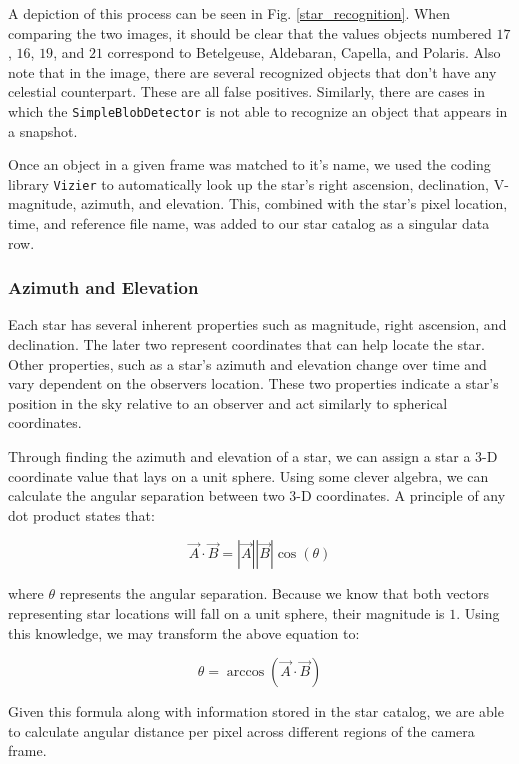 A depiction of this process can be seen in Fig. \ref{star_recognition}.  
When comparing the two images, it should be clear that the values objects numbered $17$, $16$, $19$, and $21$ correspond to Betelgeuse, Aldebaran, Capella, and Polaris. 
Also note that in the image, there are several recognized objects that don't have any celestial counterpart.
These are all false positives.
Similarly, there are cases in which the \texttt{SimpleBlobDetector} is not able to recognize an object that appears in a snapshot.


Once an object in a given frame was matched to it's name, we used the coding library \texttt{Vizier} to automatically look up the star's right ascension, declination, V-magnitude, azimuth, and elevation.  
This, combined with the star's pixel location, time, and reference file name, was added to our star catalog as a singular data row.

\subsubsection{Azimuth and Elevation}

Each star has several inherent properties such as magnitude, right ascension, and declination.  
The later two represent coordinates that can help locate the star.  
Other properties, such as a star's azimuth and elevation change over time and vary dependent on the observers location.  
These two properties indicate a star's position in the sky relative to an observer and act similarly to spherical coordinates.  

Through finding the azimuth and elevation of a star, we can assign a star a 3-D coordinate value that lays on a unit sphere.  
Using some clever algebra, we can calculate the angular separation between two 3-D coordinates.
A principle of any dot product states that:

$$ \vec{A} \cdot \vec{B} = |\vec{A}||\vec{B}| \cos{(\theta)} $$

where $\theta$ represents the angular separation.  
Because we know that both vectors representing star locations will fall on a unit sphere, their magnitude is $1$.
Using this knowledge, we may transform the above equation to:

$$ \theta = \arccos{(\vec{A} \cdot \vec{B})} $$

Given this formula along with information stored in the star catalog, we are able to calculate angular distance per pixel across different regions of the camera frame.


